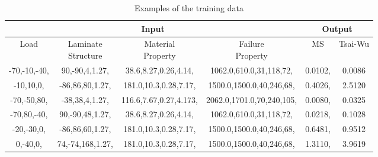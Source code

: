 \begin{table*}[!t]	
\centering
\caption{Examples of the training data}
\label{tab:traing-data}
\begin{adjustbox}{width=1\textwidth}
	\begin{tabular}{cccc|cc}
		\toprule
		\multicolumn{4}{c}{\textbf{Input}} &  \multicolumn{2}{c}{\textbf{Output}} \\
		\midrule
		Load  &  \makecell{Laminate \\ Structure }  & \makecell{Material \\ Property} & \makecell{Failure \\  Property}  & MS & Tsai-Wu \\
		\midrule

		-70,-10,-40,  & 90,-90,4,1.27, & 38.6,8.27,0.26,4.14,  & 1062.0,610.0,31,118,72,  & 0.0102, & 0.0086 \\
		-10,10,0,     & -86,86,80,1.27,& 181.0,10.3,0.28,7.17, & 1500.0,1500.0,40,246,68, & 0.4026, & 2.5120 \\
		-70,-50,80,   & -38,38,4,1.27, & 116.6,7.67,0.27,4.173,& 2062.0,1701.0,70,240,105,& 0.0080, & 0.0325 \\
		-70,80,-40,   & 90,-90,48,1.27,& 38.6,8.27,0.26,4.14,  & 1062.0,610.0,31,118,72,  & 0.0218, & 0.1028 \\
		-20,-30,0,    & -86,86,60,1.27,& 181.0,10.3,0.28,7.17, & 1500.0,1500.0,40,246,68, & 0.6481, & 0.9512 \\
		0,-40,0,      & 74,-74,168,1.27,& 181.0,10.3,0.28,7.17,& 1500.0,1500.0,40,246,68, & 1.3110, & 3.9619 \\
		\bottomrule
		\end{tabular}
\end{adjustbox}
\end{table*}
